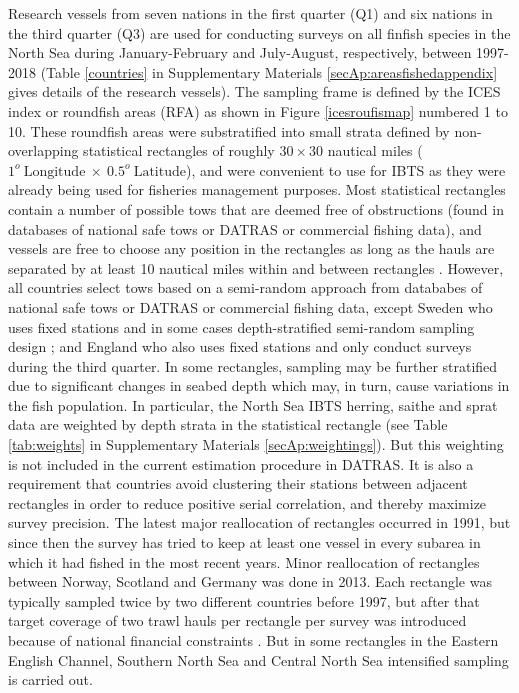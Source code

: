 \documentclass[a4paper 12pt]{article}
\numberwithin{equation}{section}
\begin{document}
Research vessels from seven nations in the first quarter (Q1) and six nations in the third quarter (Q3) are used for conducting surveys on all finfish species in the North Sea during January-February and July-August, respectively, between 1997-2018 (Table \ref{countries} in Supplementary Materials \ref{secAp:areasfishedappendix} gives details of the research vessels). The sampling frame is defined by the ICES index or roundfish areas (RFA) as shown in Figure \ref{icesroufismap} numbered 1 to 10. These  roundfish areas were substratified into small strata defined by non-overlapping statistical rectangles of roughly $30 \times 30$ nautical miles ($1^{o} \  \mathrm{Longitude} \ \times  \  0.5^{o} \ \mathrm{Latitude}$), and were convenient to use for IBTS as they were already being used for fisheries management purposes. Most statistical rectangles contain a number of possible tows that are deemed free of obstructions (found in databases of national safe tows or DATRAS or commercial fishing data), and vessels are free to choose any position in the rectangles as long as the hauls are separated by at least 10 nautical miles within and between rectangles \citep{ICES2018}. However, all countries select tows based on a semi-random approach from datababes of national safe tows or DATRAS or commercial fishing data, except Sweden who uses fixed stations and in some cases depth-stratified semi-random sampling design \citep{ICES2018}; and England who also uses fixed stations and only conduct surveys during the third quarter. In some rectangles, sampling may be further stratified due to significant changes in seabed depth which may, in turn, cause variations in the fish population. In particular, the North Sea IBTS herring, saithe and sprat data are weighted by depth strata in the statistical rectangle (see Table \ref{tab:weights} in Supplementary Materials \ref{secAp:weightings}). But this weighting is not included in the current estimation procedure in DATRAS. It is also a requirement that countries avoid clustering their stations between adjacent rectangles in order to reduce positive serial correlation, and thereby maximize survey precision.  The latest major reallocation of rectangles occurred in 1991, but since then the survey has tried to keep at least one vessel in every subarea in which it had fished in the most recent years. Minor reallocation of rectangles between Norway, Scotland and Germany was done in 2013. Each rectangle was  typically sampled twice by two different countries before 1997, but after that target coverage of two trawl hauls per rectangle per survey  was introduced because of national financial constraints \citep{ICES2015}. But in some rectangles in the Eastern English Channel, Southern North Sea and Central North Sea intensified sampling is carried out.\\
\end{document}
